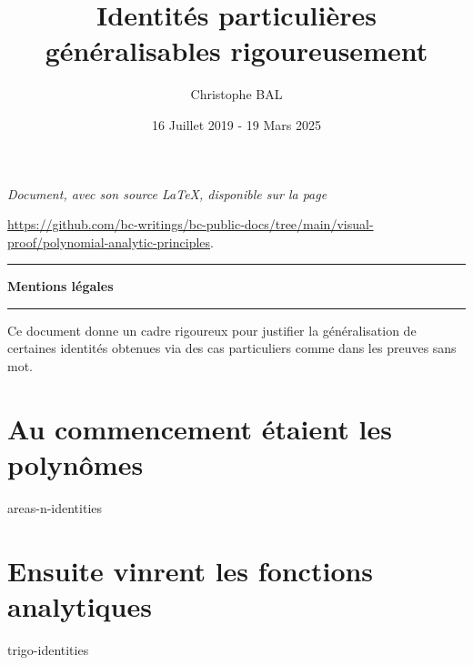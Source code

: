 \documentclass[12pt]{amsart}
\begin{document}
\title{Identités particulières généralisables rigoureusement}
\author{Christophe BAL}
\date{16 Juillet 2019 - 19 Mars 2025}

\maketitle

\begin{center}
	\itshape
	Document, avec son source \LaTeX, disponible sur la page

	\url{https://github.com/bc-writings/bc-public-docs/tree/main/visual-proof/polynomial-analytic-principles}.
\end{center}


\bigskip


\begin{center}
	\hrule\vspace{.3em}
	{
		\fontsize{1.35em}{1em}\selectfont
		\textbf{Mentions \og légales \fg}
	}

	\vspace{0.45em}
	\doclicenseThis
	\hrule
\end{center}


\bigskip


\setcounter{tocdepth}{1}
\tableofcontents



\newpage

\begin{meta-abstract*}
	Ce document donne un cadre rigoureux pour justifier la généralisation de certaines identités obtenues via des cas particuliers  comme dans les preuves sans mot. 
\end{meta-abstract*}


\section{Au commencement étaient les polynômes}

{areas-n-identities}



\newpage

\section{Ensuite vinrent les fonctions analytiques}

{trigo-identities}
\end{document}
